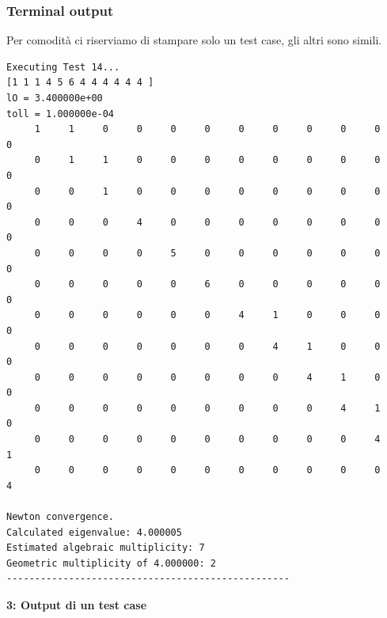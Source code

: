 \documentclass[12pt]{article}
\begin{document}
\subsubsection{Terminal output}
Per comodità ci riserviamo di stampare solo un test case, gli altri sono simili.
    \begin{framed}
    \begin{verbatim}
Executing Test 14...
[1 1 1 4 5 6 4 4 4 4 4 4 ]
lO = 3.400000e+00
toll = 1.000000e-04
     1     1     0     0     0     0     0     0     0     0     0     0
     0     1     1     0     0     0     0     0     0     0     0     0
     0     0     1     0     0     0     0     0     0     0     0     0
     0     0     0     4     0     0     0     0     0     0     0     0
     0     0     0     0     5     0     0     0     0     0     0     0
     0     0     0     0     0     6     0     0     0     0     0     0
     0     0     0     0     0     0     4     1     0     0     0     0
     0     0     0     0     0     0     0     4     1     0     0     0
     0     0     0     0     0     0     0     0     4     1     0     0
     0     0     0     0     0     0     0     0     0     4     1     0
     0     0     0     0     0     0     0     0     0     0     4     1
     0     0     0     0     0     0     0     0     0     0     0     4
        
Newton convergence.
Calculated eigenvalue: 4.000005
Estimated algebraic multiplicity: 7
Geometric multiplicity of 4.000000: 2
--------------------------------------------------
    \end{verbatim}
    \end{framed}
    \begin{center}
        \textbf{3: Output di un test case}
    \end{center}
    \newpage
\end{document}
